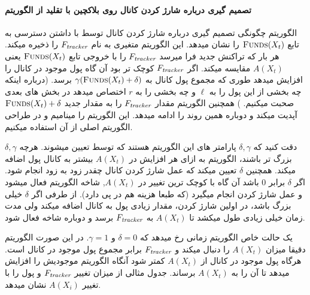 \paragraph{تصمیم گیری درباره شارژ کردن کانال روی بلاکچین با تقلید از الگوریتم \off}
الگوریتم 
چگونگی تصمیم گیری درباره شارژ کردن کانال توسط \on با داشتن دسترسی به تابع 
$\Call{Funds}{X_t}$ 
را نشان میدهد. این الگوریتم متغیری به نام 
$F_{\textit{tracker}}$
را ذخیره میکند. هر بار که تراکنش جدید فرا میرسد  \on
$F_{\textit{tracker}}$  
را با خروجی تابع
$\Call{Funds}{X_t}$
یعنی
 $A(X_t)$
مقایسه میکند. اگر $F_{\textit{tracker}}$  کوچک تر بود آن گاه \on پول موجود در کانال را افزایش میدهد طوری که مجموع پول کانال به
$\gamma(\Call{Funds}{X_t} + \delta)$
برسد. (درباره اینکه چه بخشی از این پول را به 
$\ell$
و چه بخشی را به 
$r$
اختصاص میدهد در بخش های بعدی صحبت میکنیم.
)
همچنین الگوریتم مقدار  $F_{\textit{tracker}}$ را به مقدار جدید
$\Call{Funds}{X_t} + \delta$
آپدیت میکند و دوباره همین روند را ادامه میدهد.
این الگوریتم را
مینامیم و در طراحی الگوریتم اصلی از آن استفاده میکنیم. 


دقت کنید که
$\delta,\gamma$
پارامتر های این الگوریتم هستند که توسط \on تعیین میشوند.
هرچه
$\delta,\gamma$
بزرگ تر باشند، الگوریتم \on به ازای هر افزایش در 
$A(X_t)$
بیشتر به کانال پول اضافه میکند. 
همچنین 
$\delta$
تعیین میکند که عمل شارژ کردن کانال چقدر زود به زود انجام شود. اگر 
$\delta$
برابر
$0$
باشد آن گاه با کوچک ترین تغییر در 
$A(X_t)$,
شاخه 
الگوریتم 
 فعال میشود و عمل شارژ کردن انجام میگیرد (که طبعا هزینه هم در پی دارد).
از طرفی اگر 
$\delta$
خیلی بزرگ باشد، در اولین شارژ کردن، \on مقدار زیادی پول به کانال اضافه میکند ولی مدت زمان خیلی زیادی طول میکشد تا 
$A(X_t)$
به
$F_{\textit{tracker}}$
برسد و دوباره شاخه  فعال شود.


یک حالت خاص الگوریتم 
زمانی رخ میدهد که 
$\delta = 0$
و 
$\gamma = 1$.
 در این صورت الگوریتم دقیقا میزان 
$A(X_t)$
را دنبال میکند و 
$F_{\textit{tracker}}$
برابر مجموع پول موجود در کانال است. هرگاه پول موجود در کانال از 
$A(X_t)$
کمتر شود آنگاه الگوریتم موجودیش را افزایش میدهد تا آن را به 
$A(X_t)$
برساند. جدول مثالی از
میزان تغییر 
$F_{\textit{tracker}}$
و پول \on
را با تغییر
$A(X_i)$
نشان میدهد.






